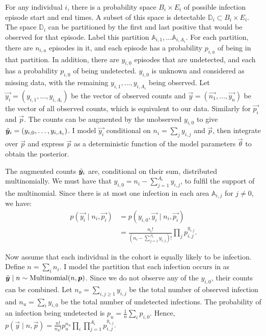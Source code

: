 \documentclass[thesis.tex]{subfiles}
\begin{document}
For any individual $i$, there is a probability space $B_i \times E_i$ of possible infection episode start and end times.
A subset of this space is detectable $\mathbb{D}_i \subset B_i \times E_i$.
The space $\mathbb{D}_i$ can be partitioned by the first and last positive that would be observed for that episode.
Label this partition $\mathbb{A}_{i,1}, \dots \mathbb{A}_{i,A_i}$.
For each partition, there are $n_{i,a}$ episodes in it, and each episode has a probability $p_{i,a}$ of being in that partition.
In addition, there are $y_{i,0}$ episodes that are undetected, and each has a probability $p_{i,0}$ of being undetected.
$y_{i,0}$ is unknown and considered as missing data, with the remaining $y_{i,1}, \dots, y_{i,A_i}$ being observed.
Let $\vec{y_i} = (y_{i,1}, \dots, y_{i,A_i})$ be the vector of observed counts and $\vec{y} = (\vec{n_1}, \dots, \vec{y_{n}})$ be the vector of all observed counts, which is equivalent to our data.
Similarly for $\vec{p_i}$ and $\vec{p}$.
The counts can be augmented by the unobserved $y_{i,0}$ to give $\tilde{\bm{y}}_i = (y_{i,0}, \dots, y_{i,A_i})$.
I model $\vec{y_i}$ conditional on $n_i = \sum_j y_{i,j}$ and $\vec{p}$, then integrate over $\vec{p}$ and express $\vec{p}$ as a deterministic function of the model parameters $\vec{\theta}$ to obtain the posterior.

The augmented counts $\tilde{\bm{y}}_i$ are, conditional on their sum, distributed multinomially.
We must have that $y_{i,0} = n_i - \sum_{j=1}^{A_i} y_{i,j}$, to fulfil the support of the multinomial.
Since there is at most one infection in each area $\mathbb{A}_{i,j}$ for $j \neq 0$, we have:
\begin{align}
p(\vec{y_i} \mid n_i, \vec{p_i})
  &= p(y_{i,0}, \vec{y_i} \mid n_i, \vec{p_i}) \\
  &= \frac{n_i!}{(n_i - \sum_{j=1}^{A_i} y_{i,j})!} \prod_j p_{i,j}^{y_{i,j}}.
\end{align}

Now assume that each individual in the cohort is equally likely to be infection.
Define $n = \sum_i n_i$.
I model the partition that each infection occurs in as $\tilde{\bm{y}} \mid n \sim \operatorname{Multinomial}(n, \bm{p})$.
Since we do not observe any of the $y_{i,0}$, their counts can be combined.
Let $n_o = \sum_{i,j\geq1} y_{i,j}$ be the total number of observed infection and $n_u = \sum_{i} y_{i,0}$ be the total number of undetected infections.
The probability of an infection being undetected is $p_u = \frac{1}{n} \sum_i p_{i,0}$.
Hence, $p(\vec{y} \mid n, \vec{p}) = \frac{n!}{n_u!} p_u^{n_u} \prod_{i} \prod_{j=1}^{A_i} p_{i,j}^{y_{i,j}}$.
\end{document}
